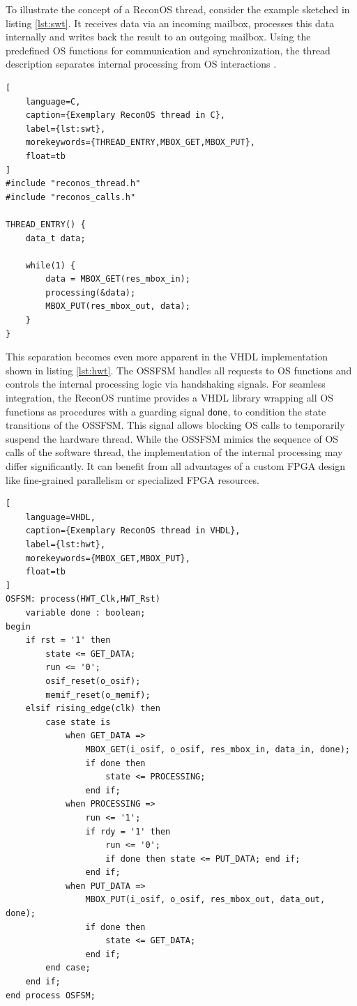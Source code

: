 To illustrate the concept of a ReconOS thread, consider the example sketched
in listing \ref{lst:swt}. It receives data via an incoming mailbox, processes
this data internally and writes back the result to an outgoing mailbox. Using
the predefined \ac{OS} functions for communication and synchronization, the
thread description separates internal processing from \ac{OS} interactions
\citep{AHK14}.
\begin{lstlisting}[
	language=C,
	caption={Exemplary ReconOS thread in C},
	label={lst:swt},
	morekeywords={THREAD_ENTRY,MBOX_GET,MBOX_PUT},
	float=tb
]
#include "reconos_thread.h"
#include "reconos_calls.h"

THREAD_ENTRY() {
	data_t data;

	while(1) {
		data = MBOX_GET(res_mbox_in);
		processing(&data);
		MBOX_PUT(res_mbox_out, data);
	}
}
\end{lstlisting}
This separation becomes even more apparent in the VHDL implementation shown in
listing \ref{lst:hwt}. The \ac{OSSFSM} handles all requests to \ac{OS}
functions and controls the internal processing logic via handshaking signals.
For seamless integration, the ReconOS runtime provides a \ac{VHDL} library
wrapping all \ac{OS} functions as procedures with a guarding signal
\lstinline{done}, to condition the state transitions of the \ac{OSSFSM}. This
signal allows blocking \ac{OS} calls to temporarily suspend the hardware
thread. While the \ac{OSSFSM} mimics the sequence of \ac{OS} calls of the
software thread, the implementation of the internal processing may differ
significantly. It can benefit from all advantages of a custom \ac{FPGA} design
like fine-grained parallelism or specialized \ac{FPGA} resources.
\begin{lstlisting}[
	language=VHDL,
	caption={Exemplary ReconOS thread in VHDL},
	label={lst:hwt},
	morekeywords={MBOX_GET,MBOX_PUT},
	float=tb
]
OSFSM: process(HWT_Clk,HWT_Rst)
	variable done : boolean;
begin
	if rst = '1' then
		state <= GET_DATA;
		run <= '0';
		osif_reset(o_osif);
		memif_reset(o_memif);
	elsif rising_edge(clk) then
		case state is
			when GET_DATA =>
				MBOX_GET(i_osif, o_osif, res_mbox_in, data_in, done);
				if done then
					state <= PROCESSING;
				end if;
			when PROCESSING =>
				run <= '1';
				if rdy = '1' then
					run <= '0';
					if done then state <= PUT_DATA; end if;
				end if;
			when PUT_DATA =>
				MBOX_PUT(i_osif, o_osif, res_mbox_out, data_out, done);
				if done then
					state <= GET_DATA;
				end if;
		end case;
	end if;
end process OSFSM;
\end{lstlisting}

